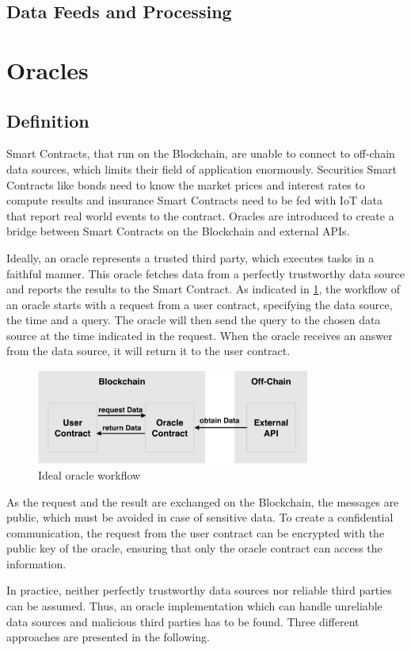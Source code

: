 \documentclass[conference]{IEEEtran}
\begin{document}
\subsection{Data Feeds and Processing}

\section{Oracles}
\subsection{Definition}
Smart Contracts, that run on the Blockchain, are unable to connect to off-chain data sources, which limits their field of application enormously. Securities Smart Contracts like bonds need to know the market prices and interest rates to compute results and insurance Smart Contracts need to be fed with IoT data that report real world events to the contract. Oracles are introduced to create a bridge between Smart Contracts on the Blockchain and external APIs. \cite{Ellis2017} \par 
Ideally, an oracle represents a trusted third party, which executes tasks in a faithful manner. This oracle fetches data from a perfectly trustworthy data source and reports the results to the Smart Contract. As indicated in \ref{idealOracle}, the workflow of an oracle starts with a request from a user contract, specifying the data source, the time and a query. The oracle will then send the query to the chosen data source at the time indicated in the request. When the oracle receives an answer from the data source, it will return it to the user contract. \cite{Ellis2017} \par 
\begin{figure}[h]
	\begin{center}
		\includegraphics[width=9cm]{idealOracle.png}
		\caption{Ideal oracle workflow}
		\label{idealOracle}
	\end{center}
\end{figure} 
As the request and the result are exchanged on the Blockchain, the messages are public, which must be avoided in case of sensitive data. To create a confidential communication, the request from the user contract can be encrypted with the public key of the oracle, ensuring that only the oracle contract can access the information. \cite{Ellis2017} \par
In practice, neither perfectly trustworthy data sources nor reliable third parties can be assumed. Thus, an oracle implementation which can handle unreliable data sources and malicious third parties has to be found. Three different approaches are presented in the following. 
\end{document}
